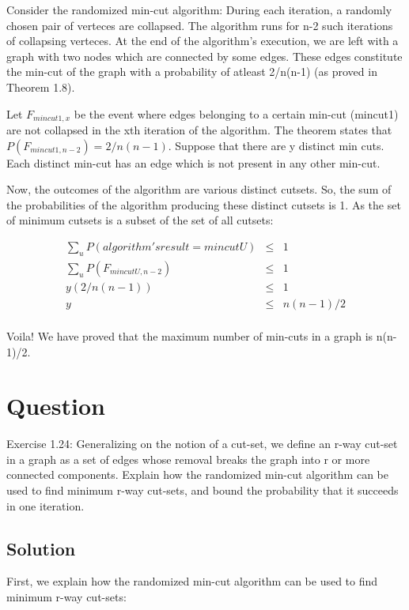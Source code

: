 \documentclass[10pt]{article}
\begin{document}
Consider the randomized min-cut algorithm: During each iteration, a randomly chosen pair of verteces are collapsed. The algorithm runs for n-2 such iterations of collapsing verteces. At the end of the algorithm's execution, we are left with a graph with two nodes which are connected by some edges. These edges constitute the min-cut of the graph with a probability of atleast 2/n(n-1) (as proved in Theorem 1.8).

Let $F_{mincut1,x}$ be the event where edges belonging to a certain min-cut (mincut1) are not collapsed in the xth iteration of the algorithm. The theorem states that $P(F_{mincut1,n-2})=2/n(n-1)$. Suppose that there are y distinct min cuts. Each distinct min-cut has an edge which is not present in any other min-cut.

Now, the outcomes of the algorithm are various distinct cutsets. So, the sum of the probabilities of the algorithm producing these distinct cutsets is 1. As the set of minimum cutsets is a subset of the set of all cutsets:

\begin{eqnarray}
\sum_{u} P(algorithm's result = mincutU) &\leq& 1\\
\sum_{u} P(F_{mincutU,n-2}) &\leq& 1\\
y(2/n(n-1)) &\leq& 1\\
y &\leq& n(n-1)/2\\
\end{eqnarray}

Voila! We have proved that the maximum number of min-cuts in a graph is n(n-1)/2.

\section{Question}

Exercise 1.24: Generalizing on the notion of a cut-set, we define an r-way cut-set in a graph as a set of edges whose removal breaks the graph into r or more connected components. Explain how the randomized min-cut algorithm can be used to find minimum r-way cut-sets, and bound the probability that it succeeds in one iteration.

\subsection{Solution}

First, we explain how the randomized min-cut algorithm can be used to find minimum r-way cut-sets:
\end{document}
